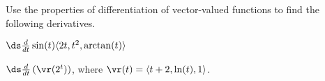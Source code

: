 \begin{activity} \label{A:9.7.3} Use the properties of differentiation of vector-valued functions to find the following derivatives.
    \ba
    \item $\ds \frac{d}{dt} \sin(t) \langle 2t, t^2, \arctan(t) \rangle$



    \item $\ds \frac{d}{dt} \left(\vr(2^t) \right)$, where $\vr(t) = \langle t+2, \ln(t), 1 \rangle$.



    \ea

\end{activity}
\begin{smallhint}

\end{smallhint}
\begin{bighint}

\end{bighint}
\begin{activitySolution}

\end{activitySolution}
\aftera
